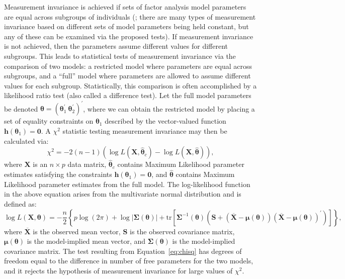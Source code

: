 \documentclass[man]{apa}
\begin{document}
Measurement invariance is achieved
if sets of factor analysis model parameters are equal across
subgroups of individuals 
(; there are many types of measurement invariance based
on different sets of model parameters being held constant, but any of these
can be examined via the proposed tests).  If measurement invariance is
not achieved, 
then the parameters assume different values for different
subgroups.  This leads to statistical tests of measurement
invariance via the comparison of two models: a restricted model where
parameters are equal across subgroups, and a ``full'' model
where parameters are allowed to assume different values for each
subgroup.  Statistically, this comparison is often 
accomplished by a likelihood ratio test (also called a
difference test).  Let the full model parameters be denoted 
${\bm \theta} = ({\bm \theta}_1^{\prime}\ {\bm
  \theta}_2^{\prime})^{\prime}$, where we can obtain the restricted model
by placing a set of equality constraints on ${\bm \theta}_1$ described
by the vector-valued function ${\bm
  h}({\bm \theta}_1) = {\bm 0}$.  A $\chi^2$ statistic testing
measurement invariance may then be calculated via:
\begin{equation}
    \label{eq:chisq}
 \chi^2 = -2(n-1)(\log L({\bm X},
\widehat{{\bm \theta}}_c) - \log L({\bm X},\widehat{{\bm \theta}})),
\end{equation}
where ${\bm{X}}$ is an $n \times p$ data matrix, $\widehat{\bm \theta}_c$
contains Maximum Likelihood parameter estimates satisfying the
constraints ${\bm h}({\bm \theta}_1) = {\bm 0}$, and $\widehat{\bm
  \theta}$ contains Maximum Likelihood parameter estimates from the
full model.  The log-likelihood function in the above equation arises
from the multivariate normal distribution and is defined as:
\begin{equation}
    \label{eq:loglik}
    \log L( \bm{X}, \bm{\theta}) = -\frac{n}{2} \left \{ p
          \log(2\pi) + \log | {\bm{\Sigma}}({\bm{\theta}}) | +
          \text{tr}[{\bm{\Sigma}}^{-1}({\bm{\theta}})({\bm{S}} +
          ({\overline{{\bm{X}}} -
            {\bm{\mu}}({\bm{\theta}})})({\overline{{\bm{X}}} -
            {\bm{\mu}}({\bm{\theta}})})^{\prime})]\right \},
\end{equation}
where $\overline{{\bm{X}}}$ is the observed mean vector, ${\bm S}$ is
the observed covariance matrix, ${\bm{\mu}}({\bm{\theta}})$ is the
model-implied mean vector, and ${\bm{\Sigma}}({\bm{\theta}})$ is the
model-implied covariance matrix.  The test resulting from
Equation~\eqref{eq:chisq} has 
degrees of freedom equal to the difference in number of free
parameters for the two models, and it rejects the hypothesis of measurement
invariance for large values of $\chi^2$.
\end{document}
